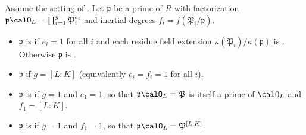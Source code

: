 \begin{definition} \label{definition:splitting_type_of_a_prime_in_extension_of_dedekind_domains}
    Assume the setting of . Let $\mathfrak{p}$ be a prime of $R$ with factorization $\mathfrak{p}\calO_L = \prod_{i=1}^{g} \mathfrak{P}_i^{e_i}$ and inertial degrees $f_i = f(\mathfrak{P}_i/\mathfrak{p})$.

    \begin{itemize}
        \item $\mathfrak{p}$ is  if $e_i = 1$ for all $i$ and each residue field extension $\kappa(\mathfrak{P}_i)/\kappa(\mathfrak{p})$ is . Otherwise $\mathfrak{p}$ is .
        \item $\mathfrak{p}$  if $g = [L:K]$ (equivalently $e_i = f_i = 1$ for all $i$).
        \item $\mathfrak{p}$ is  if $g = 1$ and $e_1 = 1$, so that $\mathfrak{p}\calO_L = \mathfrak{P}$ is itself a prime of $\calO_L$ and $f_1 = [L:K]$.
        \item $\mathfrak{p}$ is  if $g = 1$ and $f_1 = 1$, so that $\mathfrak{p}\calO_L = \mathfrak{P}^{[L:K]}$.
    \end{itemize}
\end{definition}